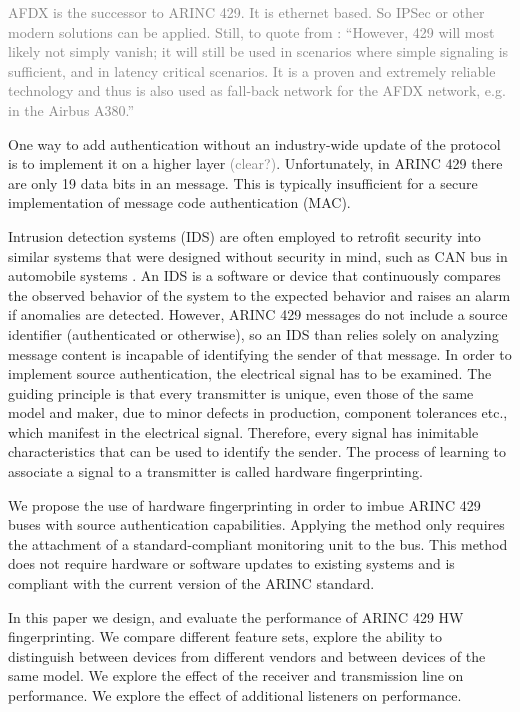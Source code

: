 \documentclass[conference]{IEEEtran}
\begin{document}
  \textcolor{gray}{AFDX is the successor to ARINC 429. It is ethernet based. So IPSec or other modern solutions can be applied. Still, to quote from \cite{fuchs2012evolution}: ``However, 429 will most likely not simply vanish; it will still be used in scenarios where simple signaling is sufficient, and in latency critical scenarios. It is a proven and extremely reliable technology and thus is also used as fall-back network for the AFDX network, e.g. in the Airbus A380.''}
  
  One way to add authentication without an industry-wide update of the protocol is to implement it on a higher layer \textcolor{gray}{(clear?)}. Unfortunately, in ARINC 429 there are only 19 data bits in an message. This is typically insufficient for a secure implementation of message code authentication (MAC).
  
  Intrusion detection systems (IDS) are often employed to retrofit security into similar systems that were designed without security in mind, such as CAN bus in automobile systems \cite{}. An IDS is a software or device that continuously compares the observed behavior of the system to the expected behavior and raises an alarm if anomalies are detected. However, ARINC 429 messages do not include a source identifier (authenticated or otherwise), so an IDS than relies solely on analyzing message content is incapable of identifying the sender of that message. In order to implement source authentication, the electrical signal has to be examined. The guiding principle is that every transmitter is unique, even those of the same model and maker, due to minor defects in production, component tolerances etc., which manifest in the electrical signal. Therefore, every signal has inimitable characteristics that can be used to identify the sender. The process of learning to associate a signal to a transmitter is called hardware fingerprinting.
  
  We propose the use of hardware fingerprinting in order to imbue ARINC 429 buses with source authentication capabilities. Applying the method only requires the attachment of a standard-compliant monitoring unit to the bus. This method does not require hardware or software updates to existing systems and is compliant with the current version of the ARINC standard.
  
  In this paper we design, and evaluate the performance of ARINC 429 HW fingerprinting. We compare different feature sets, explore the ability to distinguish between devices from different vendors and between devices of the same model. We explore the effect of the receiver and transmission line on performance. We explore the effect of additional listeners on performance.
  
\end{document}
